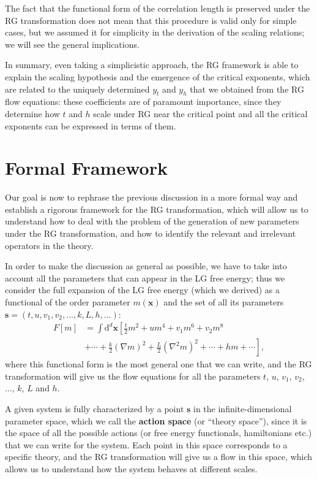 The fact that the functional form of the correlation length is preserved under the RG transformation does not mean that this procedure is valid only for simple cases, but we assumed it for simplicity in the derivation of the scaling relations; we will see the general implications.

In summary, even taking a simplicistic approach, the RG framework is able to explain the scaling hypothesis and the emergence of the critical exponents, which are related to the uniquely determined \(y_t\) and \(y_h\) that we obtained from the RG flow equations: these coefficients are of paramount importance, since they determine how \(t\) and \(h\) scale under RG near the critical point and all the critical exponents can be expressed in terms of them.

\section{Formal Framework}

Our goal is now to rephrase the previous discussion in a more formal way and establish a rigorous framework for the RG transformation, which will allow us to understand how to deal with the problem of the generation of new parameters under the RG transformation, and how to identify the relevant and irrelevant operators in the theory.

In order to make the discussion as general as possible, we have to take into account all the parameters that can appear in the LG free energy; thus we consider the full expansion of the LG free energy (which we derived) as a functional of the order parameter \(m(\mathbf{x})\) and the set of all its parameters \(\mathbf{s} = (t, u, v_1, v_2, \dots, k, L, h, \dots)\):
\[
    \begin{aligned}
        F[m] & = \int \mathrm{d}^d \mathbf{x} \left[ \frac{t}{2} m^2 + u m^4 + v_1 m^6 + v_2 m^8 \right.               \\
             & \left. + \cdots + \frac{k}{2} (\nabla m)^2 + \frac{L}{2} (\nabla^2 m)^2 + \cdots + hm + \cdots \right],
    \end{aligned}
\]
where this functional form is the most general one that we can write, and the RG transformation will give us the flow equations for all the parameters \(t\), \(u\), \(v_1\), \(v_2\), \(\dots\), \(k\), \(L\) and \(h\).

A given system is fully characterized by a point \(\mathbf{s}\) in the infinite-dimensional parameter space, which we call the \textbf{action space} (or ``theory space''), since it is the space of all the possible actions (or free energy functionals, hamiltonians etc.) that we can write for the system. Each point in this space corresponds to a specific theory, and the RG transformation will give us a flow in this space, which allows us to understand how the system behaves at different scales.

